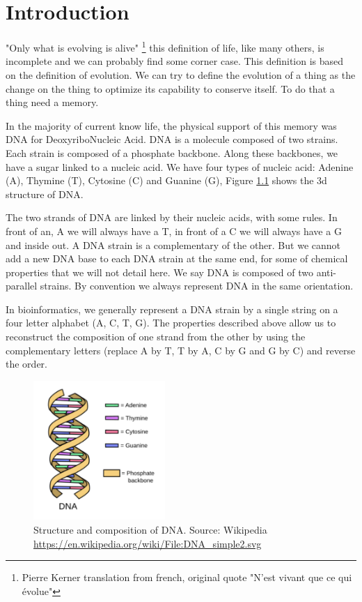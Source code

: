 \documentclass[./main.tex]{subfiles}
\begin{document}
\chapter{Introduction}\label{chapter:introduction}

"Only what is evolving is alive" \footnote{Pierre Kerner translation from french, original quote "N'est vivant que ce qui évolue"} this definition of life, like many others, is incomplete and we can probably find some corner case. This definition is based on the definition of evolution. We can try to define the evolution of a thing as the change on the thing to optimize its capability to conserve itself. To do that a thing need a memory.

In the majority of current know life, the physical support of this memory was DNA for DeoxyriboNucleic Acid. DNA is a molecule composed of two strains. Each strain is composed of a phosphate backbone. Along these backbones, we have a sugar linked to a nucleic acid. We have four types of nucleic acid: Adenine (A), Thymine (T), Cytosine (C) and Guanine (G), Figure \ref{intro:fig:dna_rna_pres} shows the 3d structure of DNA.

The two strands of DNA are linked by their nucleic acids, with some rules. In front of an, A we will always have a T, in front of a C we will always have a G and inside out. A DNA strain is a complementary of the other. But we cannot add a new DNA base to each DNA strain at the same end, for some of chemical properties that we will not detail here. We say DNA is composed of two anti-parallel strains. By convention we always represent DNA in the same orientation.

In bioinformatics, we generally represent a DNA strain by a single string on a four letter alphabet (A, C, T, G). The properties described above allow us to reconstruct the composition of one strand from the other by using the complementary letters (replace A by T, T by A, C by G and G by C) and reverse the order.%

\begin{figure}[ht]
    \centering
    \includegraphics[width=5cm]{introduction/images/DNA.pdf}
    \caption{Structure and composition of DNA. Source: Wikipedia \protect\url{https://en.wikipedia.org/wiki/File:DNA_simple2.svg}}
    \label{intro:fig:dna_rna_pres}
\end{figure}
\end{document}
